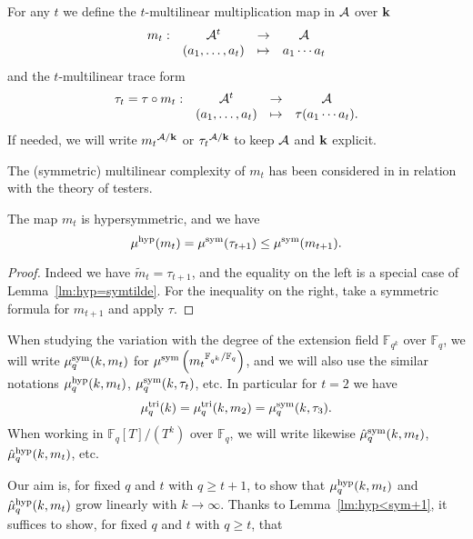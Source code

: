 \documentclass[11pt]{article}
\begin{document}
For any $t$ we define the $t$-multilinear multiplication map in $\mathcal{A}$ over $\mathbf{k}$
\[
\begin{array}{cccc}
m_t:&\mathcal{A}^t&\to&\mathcal{A}\\
&(a_1,\dots,a_t)&\mapsto&a_1\cdots a_t
\end{array}
\]
and the $t$-multilinear trace form
\[
\begin{array}{cccc}
\tau_t=\tau\circ m_t:&\mathcal{A}^t&\to&\mathcal{A}\\
&(a_1,\dots,a_t)&\mapsto&\tau(a_1\cdots a_t).
\end{array}
\]
If needed, we will write ${m_t}^{\mathcal{A}/\mathbf{k}}$ or ${\tau_t}^{\mathcal{A}/\mathbf{k}}$ to keep $\mathcal{A}$ and $\mathbf{k}$ explicit. 

The (symmetric) multilinear complexity of $m_t$ has been considered in \cite{Bshouty13} in relation with the theory of testers.

\begin{lm}
\label{lm:hyp<sym+1}
The map $m_t$ is hypersymmetric, and we have
\[
\mu^{\textrm{hyp}}(m_t)=\mu^{\textrm{sym}}(\tau_{t+1})\leq\mu^{\textrm{sym}}(m_{t+1}).
\] 
\end{lm}
\begin{proof}
Indeed we have $\widetilde{m}_t=\tau_{t+1}$, and the equality on the left is a special case of Lemma~\ref{lm:hyp=symtilde}.
For the inequality on the right, take a symmetric formula for $m_{t+1}$ and apply $\tau$.
\end{proof}

When studying the variation with the degree of the extension field $\mathbb{F}_{q^k}$ over $\mathbb{F}_q$,
we will write $\mu^{\textrm{sym}}_q(k,m_t)$ for $\mu^{\textrm{sym}}\left({m_t}^{\mathbb{F}_{q^k}/\mathbb{F}_q}\right)$,
and we will also use the similar notations $\mu^{\textrm{hyp}}_q(k,m_t)$, $\mu^{\textrm{sym}}_q(k,\tau_t)$, etc.
In particular for $t=2$ we have
\[
\mutri_q(k)=\mutri_q(k,m_2)=\musym_q(k,\tau_3). %
\]
When working in $\mathbb{F}_q[T]/(T^k)$ over $\mathbb{F}_q$,
we will write likewise $\hat\mu^{\textrm{sym}}_q(k,m_t)$, $\hat\mu^{\textrm{hyp}}_q(k,m_t)$, etc.

Our aim is, for fixed $q$ and $t$ with $q\geq t+1$, to show that $\mu^{\textrm{hyp}}_q(k,m_t)$ and $\hat\mu^{\textrm{hyp}}_q(k,m_t)$ grow linearly with $k\to\infty$.
Thanks to Lemma~\ref{lm:hyp<sym+1}, it suffices to show, for fixed $q$ and $t$ with $q\geq t$, that
\end{document}
